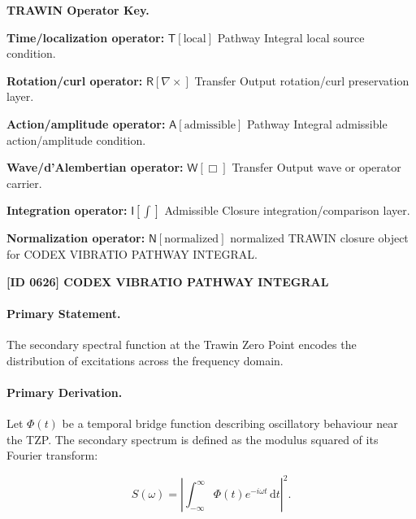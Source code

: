 \par\vspace{0.45\baselineskip}
\noindent\begin{minipage}[t]{\linewidth}
\begingroup
\small
\raggedright
\textbf{TRAWIN Operator Key.}\par
\noindent\textbf{Time/localization operator:} $\mathsf{T}\!\left[\mathrm{local}\right]$ Pathway Integral local source condition.\par
\noindent\textbf{Rotation/curl operator:} $\mathsf{R}\!\left[\nabla\times\right]$ Transfer Output rotation/curl preservation layer.\par
\noindent\textbf{Action/amplitude operator:} $\mathsf{A}\!\left[\mathrm{admissible}\right]$ Pathway Integral admissible action/amplitude condition.\par
\noindent\textbf{Wave/d'Alembertian operator:} $\mathsf{W}\!\left[\Box\right]$ Transfer Output wave or operator carrier.\par
\noindent\textbf{Integration operator:} $\mathsf{I}\!\left[\int\right]$ Admissible Closure integration/comparison layer.\par
\noindent\textbf{Normalization operator:} $\mathsf{N}\!\left[\mathrm{normalized}\right]$ normalized TRAWIN closure object for CODEX VIBRATIO PATHWAY INTEGRAL.\par
\endgroup
\end{minipage}

\clearpage
\noindent\textbf{[ID 0626] CODEX VIBRATIO PATHWAY INTEGRAL}\par
\vspace{0.35em}
\paragraph{Primary Statement.}

The secondary spectral function at the Trawin Zero Point encodes the distribution of excitations across the frequency domain.

\paragraph{Primary Derivation.}

Let $\Phi(t)$ be a temporal bridge function describing oscillatory behaviour near the TZP.
The secondary spectrum is defined as the modulus squared of its Fourier transform:

\begin{equation}
S(\omega) = \left| \int_{-\infty}^{\infty} \Phi(t) e^{-i\omega t} \, \mathrm{d}t \right|^2 .
\end{equation}

